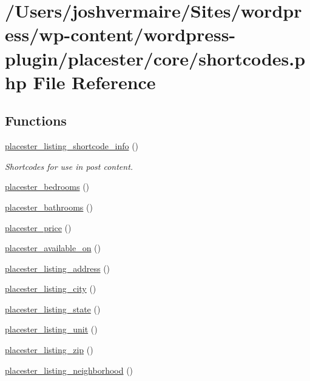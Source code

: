 \hypertarget{shortcodes_8php}{
\section{/Users/joshvermaire/Sites/wordpress/wp-\/content/wordpress-\/plugin/placester/core/shortcodes.php File Reference}
\label{df/d50/shortcodes_8php}
}
\subsection*{Functions}
\begin{DoxyCompactItemize}
\item 
\hyperlink{shortcodes_8php_a78923d0065a5db6503a50064e3b2de56}{placester\_\-listing\_\-shortcode\_\-info} ()
\begin{DoxyCompactList}\small\item\em Shortcodes for use in post content. \end{DoxyCompactList}\item 
\hyperlink{shortcodes_8php_a13b21b2879919d6b9c3e58904b074e9a}{placester\_\-bedrooms} ()
\item 
\hyperlink{shortcodes_8php_a4663818fabc63c010dfa89d3396e43fc}{placester\_\-bathrooms} ()
\item 
\hyperlink{shortcodes_8php_a18351bdebc32da9569b996fd0985e53a}{placester\_\-price} ()
\item 
\hyperlink{shortcodes_8php_ad8b5ac4fe68ba00e8caa1dc1370b2ed4}{placester\_\-available\_\-on} ()
\item 
\hyperlink{shortcodes_8php_a45980eeca66ea816c73d31361fa295ff}{placester\_\-listing\_\-address} ()
\item 
\hyperlink{shortcodes_8php_aeef3312316acbfb2cf76c72eab0d31a5}{placester\_\-listing\_\-city} ()
\item 
\hyperlink{shortcodes_8php_a8ff06026297622a9f4271a4351fc4f97}{placester\_\-listing\_\-state} ()
\item 
\hyperlink{shortcodes_8php_ac01ffbf960d22cd5cea074e1e8f74a96}{placester\_\-listing\_\-unit} ()
\item 
\hyperlink{shortcodes_8php_a3a2558f610349361f9208a9bd899e718}{placester\_\-listing\_\-zip} ()
\item 
\hyperlink{shortcodes_8php_ab7ed88bcaca60087b580bef0a982eedb}{placester\_\-listing\_\-neighborhood} ()
\item 

\end{DoxyCompactItemize}
